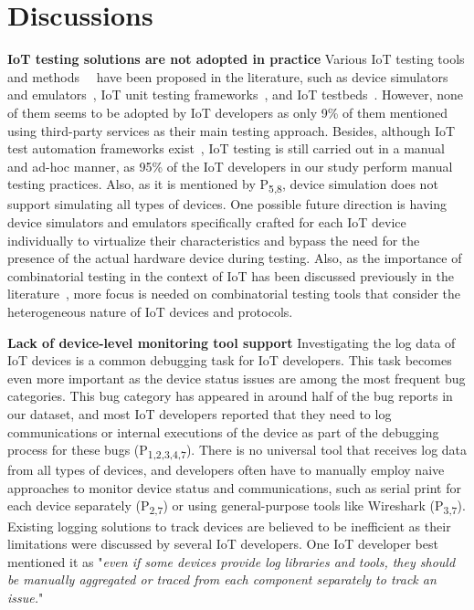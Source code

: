 {\section{Discussions}
\textbf{IoT testing solutions are not adopted in practice}
Various IoT testing tools and methods~\cite{testingtools2018}~\cite{pontes2018test} have been proposed in the literature, such as device simulators~\cite{iotify} and emulators~\cite{looga2012mammoth}, IoT unit testing frameworks~\cite{ArduinoUnit,platformio}, and IoT testbeds~\cite{iottestbed}. However, none of them seems to be adopted by IoT developers as only 9\% of them mentioned using third-party services as their main testing approach. Besides, although IoT test automation frameworks exist~\cite{iotify}, IoT testing is still carried out in a manual and ad-hoc manner, as 95\% of the IoT developers in our study perform manual testing practices. Also, as it is mentioned by P\textsubscript{5,8}, device simulation does not support simulating all types of devices. One possible future direction is having device simulators and emulators specifically crafted for each IoT device individually to virtualize their characteristics and bypass the need for the presence of the actual hardware device during testing. Also, as the importance of combinatorial testing in the context of IoT has been discussed previously in the literature~\cite{voas2018testing}, more focus is needed on combinatorial testing tools that consider the heterogeneous nature of IoT devices and protocols.

\textbf{Lack of device-level monitoring tool support}
Investigating the log data of IoT devices is a common debugging task for IoT developers. This task becomes even more important as the device status issues are among the most frequent bug categories. This bug category has appeared in around half of the bug reports in our dataset, and most IoT developers reported that they need to log communications or internal executions of the device as part of the debugging process for these bugs (P\textsubscript{1,2,3,4,7}). There is no universal tool that receives log data from all types of devices, and developers often have to manually employ naive approaches to monitor device status and communications, such as serial print for each device separately (P\textsubscript{2,7}) or using general-purpose tools like Wireshark (P\textsubscript{3,7}). Existing logging solutions to track devices are believed to be inefficient as their limitations were discussed by several IoT developers. One IoT developer best mentioned it as "\emph{even if some devices provide log libraries and tools, they should be manually aggregated or traced from each component separately to track an issue.}"

}
